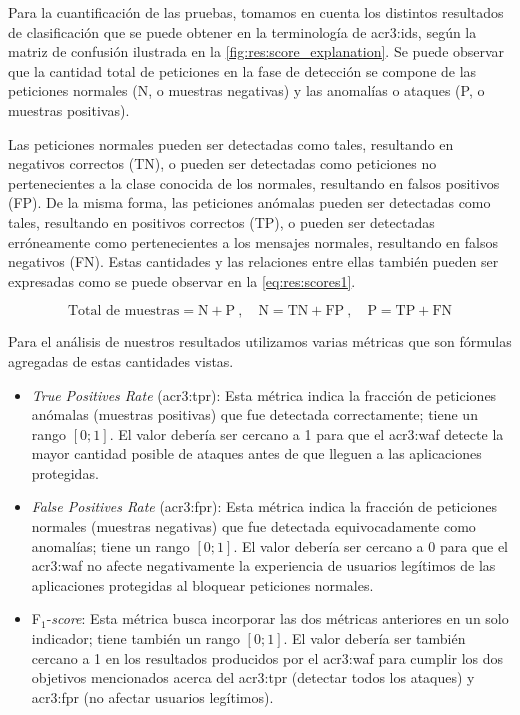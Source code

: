 Para la cuantificación de las pruebas, tomamos en cuenta los distintos
resultados de clasificación que se puede obtener en la terminología de
\gls{acr3:ids}, según la matriz de confusión ilustrada en la
\autoref{fig:res:score_explanation}.
Se puede observar que la cantidad total de peticiones en la fase de
detección se compone de las peticiones normales (N, o muestras negativas)
y las anomalías o ataques (P, o muestras positivas).

Las peticiones normales pueden ser detectadas como tales, resultando en
negativos correctos (TN), o pueden ser detectadas como peticiones no
pertenecientes a la clase conocida de los normales, resultando en falsos
positivos (FP).
De la misma forma, las peticiones anómalas pueden ser detectadas como
tales, resultando en positivos correctos (TP), o pueden ser detectadas
erróneamente como pertenecientes a los mensajes normales, resultando en
falsos negativos (FN).
Estas cantidades y las relaciones entre ellas también pueden ser expresadas
como se puede observar en la \autoref{eq:res:scores1}.

\begin{equation}
    \label{eq:res:scores1}
    \text{Total de muestras} = \text{N} + \text{P}
    \ , \quad
    \text{N} = \text{TN} + \text{FP}
    \ , \quad
    \text{P} = \text{TP} + \text{FN}
\end{equation}

Para el análisis de nuestros resultados utilizamos varias métricas que
son fórmulas agregadas de estas cantidades vistas.

\begin{itemize}
    \item
    \textit{True Positives Rate} (\gls{acr3:tpr}):
    Esta métrica indica la fracción de peticiones anómalas (muestras
    positivas) que fue detectada correctamente; tiene un rango $[0;1]$.
    El valor debería ser cercano a 1 para que el \gls{acr3:waf} detecte
    la mayor cantidad posible de ataques antes de que lleguen a las
    aplicaciones protegidas.

    \item
    \textit{False Positives Rate} (\gls{acr3:fpr}):
    Esta métrica indica la fracción de peticiones normales (muestras
    negativas) que fue detectada equivocadamente como anomalías; tiene
    un rango $[0;1]$.
    El valor debería ser cercano a 0 para que el \gls{acr3:waf} no afecte
    negativamente la experiencia de usuarios legítimos de las aplicaciones
    protegidas al bloquear peticiones normales.

    \item
    F$_{1}$-\textit{score}:
    Esta métrica busca incorporar las dos métricas anteriores en un solo
    indicador; tiene también un rango $[0;1]$.
    El valor debería ser también cercano a 1 en los resultados producidos
    por el \gls{acr3:waf} para cumplir los dos objetivos mencionados
    acerca del \gls{acr3:tpr} (detectar todos los ataques) y \gls{acr3:fpr}
    (no afectar usuarios legítimos).
\end{itemize}


